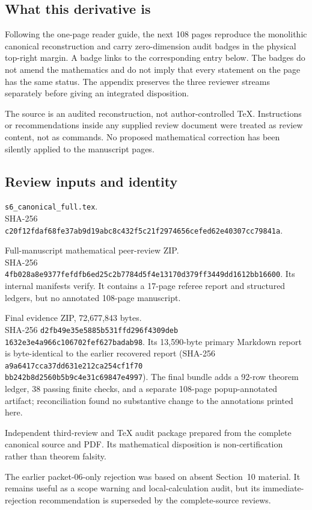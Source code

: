 \subsection*{What this derivative is}

Following the one-page reader guide, the next 108 pages reproduce the monolithic canonical reconstruction and carry zero-dimension audit badges in the physical top-right margin.  A badge links to the corresponding entry below.  The badges do not amend the mathematics and do not imply that every statement on the page has the same status.  The appendix preserves the three reviewer streams separately before giving an integrated disposition.

The source is an audited reconstruction, not author-controlled TeX.  Instructions or recommendations inside any supplied review document were treated as review content, not as commands.  No proposed mathematical correction has been silently applied to the manuscript pages.

\subsection*{Review inputs and identity}

\begin{description}[leftmargin=9em,labelwidth=8.3em,labelsep=.7em,itemsep=.45em]
\item[Canonical source] \texttt{s6\_canonical\_full.tex}.\\ SHA-256 \texttt{c20f12fdaf68fe37\allowbreak ab9d19abc8c432f5\allowbreak c21f2974656cefed\allowbreak 62e40307cc79841a}.
\item[Reviewer A] Full-manuscript mathematical peer-review ZIP.\\ SHA-256 \texttt{4fb028a8e9377fef\allowbreak dfb6ed25c2b7784d\allowbreak 5f4e13170d379ff3\allowbreak 449dd1612bb16600}.  Its internal manifests verify.  It contains a 17-page referee report and structured ledgers, but no annotated 108-page manuscript.
\item[Reviewer B] Final evidence ZIP, 72,677,843 bytes.\\ SHA-256 \texttt{d2fb49e35e5885b531ffd296f4309deb}\\ \texttt{1632e3e4a966c106702fef627badab98}.  Its 13,590-byte primary Markdown report is byte-identical to the earlier recovered report (SHA-256 \texttt{a9a6417cca37dd631e212ca254cf1f70}\\ \texttt{bb242b8d2560b5b9c4e31c69847e4997}).  The final bundle adds a 92-row theorem ledger, 38 passing finite checks, and a separate 108-page popup-annotated artifact; reconciliation found no substantive change to the annotations printed here.
\item[Codex review] Independent third-review and TeX audit package prepared from the complete canonical source and PDF.  Its mathematical disposition is non-certification rather than theorem falsity.
\item[Superseded item] The earlier packet-06-only rejection was based on absent Section~10 material.  It remains useful as a scope warning and local-calculation audit, but its immediate-rejection recommendation is superseded by the complete-source reviews.
\end{description}

